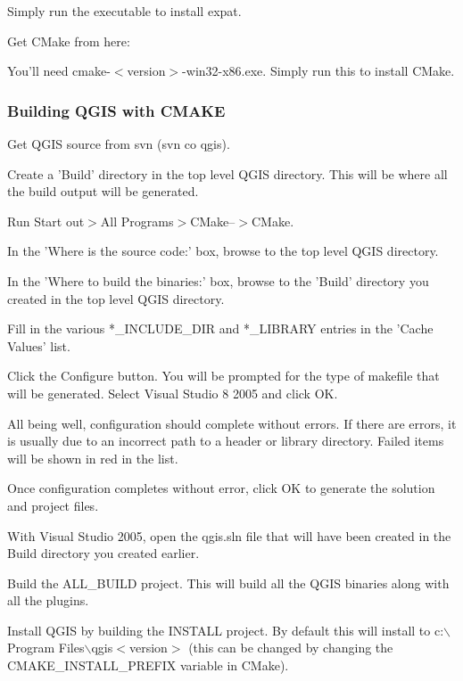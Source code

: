 Simply run the executable to install expat.

Get CMake from here:

	\begin{quotation}
	\end{quotation}
You'll need cmake-$<$version$>$-win32-x86.exe. Simply run this to install CMake.

\subsubsection{Building QGIS with CMAKE}
Get QGIS source from svn (svn co  qgis).

Create a 'Build' directory in the top level QGIS directory. This will be where all the build output will be generated.

Run Start out{$>$All Programs}$>$CMake--$>$CMake. 

In the 'Where is the source code:' box, browse to the top level QGIS directory.

In the 'Where to build the binaries:' box, browse to the 'Build' directory you created in the top level QGIS directory.

Fill in the various *\_INCLUDE\_DIR and *\_LIBRARY entries in the 'Cache Values' list.

Click the Configure button. You will be prompted for the type of makefile that will be generated. Select Visual Studio 8 2005 and click OK.

All being well, configuration should complete without errors. If there are errors, it is usually due to an incorrect path to a header or library directory. Failed items will be shown in red in the list.

Once configuration completes without error, click OK to generate the solution and project files.

With Visual Studio 2005, open the qgis.sln file that will have been created in the Build directory you created earlier.

Build the ALL\_BUILD project. This will build all the QGIS binaries along with all the plugins.

 Install QGIS by building the INSTALL project. By default this will install to c:$\backslash$Program Files$\backslash$qgis$<$version$>$ (this can be changed by changing the CMAKE\_INSTALL\_PREFIX variable in CMake). 

